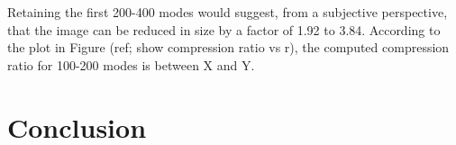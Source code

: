 \documentclass[conference]{IEEEtran}
\begin{document}
    Retaining the first 200-400 modes would suggest, from a subjective perspective, that the image can be reduced in size by a factor of 1.92 to 3.84. According to the plot in Figure (ref; show compression ratio vs r), the computed compression ratio for 100-200 modes is between X and Y.





    \section{Conclusion}
    

    \nocite{jaradet_svd_image_compression}
    \nocite{shlens_2014_tutorial}
    \nocite{omar_image_compression}
    \nocite{xu_color_conversion}
    \newpage
    {}
    
\end{document}
